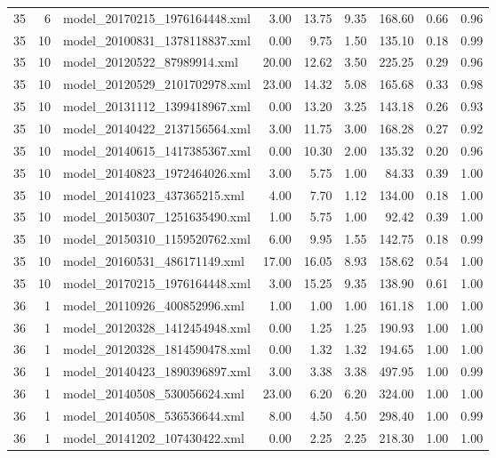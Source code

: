 \begin{table}[ht]
\begin{tabular}{rrlrrrrrr}
   35 &   6 & model\_20170215\_1976164448.xml & 3.00 & 13.75 & 9.35 & 168.60 & 0.66 & 0.96 \\ 
   35 &  10 & model\_20100831\_1378118837.xml & 0.00 & 9.75 & 1.50 & 135.10 & 0.18 & 0.99 \\ 
   35 &  10 & model\_20120522\_87989914.xml & 20.00 & 12.62 & 3.50 & 225.25 & 0.29 & 0.96 \\ 
   35 &  10 & model\_20120529\_2101702978.xml & 23.00 & 14.32 & 5.08 & 165.68 & 0.33 & 0.98 \\ 
   35 &  10 & model\_20131112\_1399418967.xml & 0.00 & 13.20 & 3.25 & 143.18 & 0.26 & 0.93 \\ 
   35 &  10 & model\_20140422\_2137156564.xml & 3.00 & 11.75 & 3.00 & 168.28 & 0.27 & 0.92 \\ 
   35 &  10 & model\_20140615\_1417385367.xml & 0.00 & 10.30 & 2.00 & 135.32 & 0.20 & 0.96 \\ 
   35 &  10 & model\_20140823\_1972464026.xml & 3.00 & 5.75 & 1.00 & 84.33 & 0.39 & 1.00 \\ 
   35 &  10 & model\_20141023\_437365215.xml & 4.00 & 7.70 & 1.12 & 134.00 & 0.18 & 1.00 \\ 
   35 &  10 & model\_20150307\_1251635490.xml & 1.00 & 5.75 & 1.00 & 92.42 & 0.39 & 1.00 \\ 
   35 &  10 & model\_20150310\_1159520762.xml & 6.00 & 9.95 & 1.55 & 142.75 & 0.18 & 0.99 \\ 
   35 &  10 & model\_20160531\_486171149.xml & 17.00 & 16.05 & 8.93 & 158.62 & 0.54 & 1.00 \\ 
   35 &  10 & model\_20170215\_1976164448.xml & 3.00 & 15.25 & 9.35 & 138.90 & 0.61 & 1.00 \\ 
   36 &   1 & model\_20110926\_400852996.xml & 1.00 & 1.00 & 1.00 & 161.18 & 1.00 & 1.00 \\ 
   36 &   1 & model\_20120328\_1412454948.xml & 0.00 & 1.25 & 1.25 & 190.93 & 1.00 & 1.00 \\ 
   36 &   1 & model\_20120328\_1814590478.xml & 0.00 & 1.32 & 1.32 & 194.65 & 1.00 & 1.00 \\ 
   36 &   1 & model\_20140423\_1890396897.xml & 3.00 & 3.38 & 3.38 & 497.95 & 1.00 & 0.99 \\ 
   36 &   1 & model\_20140508\_530056624.xml & 23.00 & 6.20 & 6.20 & 324.00 & 1.00 & 1.00 \\ 
   36 &   1 & model\_20140508\_536536644.xml & 8.00 & 4.50 & 4.50 & 298.40 & 1.00 & 0.99 \\ 
   36 &   1 & model\_20141202\_107430422.xml & 0.00 & 2.25 & 2.25 & 218.30 & 1.00 & 1.00 \\ 

\end{tabular}
\end{table}
